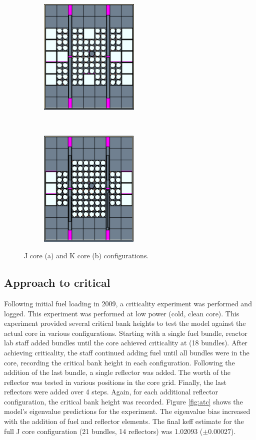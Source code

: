 \documentclass{UWNR_modeling}
\begin{document}
\begin{figure}[h]
    \centering
    \begin{subfigure}[t]{0.5\textwidth}
        \centering
        \includegraphics[height=2.2in]{jcore.pdf}
        \caption{}
    \end{subfigure}%
    ~ 
    \begin{subfigure}[t]{0.5\textwidth}
        \centering
        \includegraphics[height=2.2in]{kcore.pdf}
        \caption{}
    \end{subfigure}
    \caption{J core (a) and K core (b) configurations.}
    \label{fig:core_configurations}
\end{figure}

\subsection{Approach to critical}
Following initial fuel loading in 2009, a criticality experiment was performed and logged. This experiment was performed at low power (cold, clean core). This experiment provided several critical bank heights to test the model against the actual core in various configurations. Starting with a single fuel bundle, reactor lab staff added bundles until the core achieved criticality at (18 bundles). After achieving criticality, the staff continued adding fuel until all bundles were in the core, recording the critical bank height in each configuration. Following the addition of the last bundle, a single reflector was added. The worth of the reflector was tested in various positions in the core grid. Finally, the last reflectors were added over 4 steps.  Again, for each additional reflector configuration, the critical bank height was recorded.  Figure \ref{fig:atc} shows the model's eigenvalue predictions for the experiment. The eigenvalue bias increased with the addition of fuel and reflector elements. The final keff estimate for the full J core configuration (21 bundles, 14 reflectors) was 1.02093 ($\pm 0.00027$).
\end{document}
